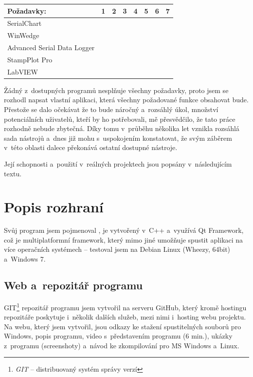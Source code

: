 \documentclass[12pt, a4paper, oneside]{article}
\newcommand{\It}{\textit}  %
\newcommand{\Has}{\textcolor{green}{\CheckmarkBold}}
\newcommand{\NoHas}{\textcolor{red}{\XSolidBrush}}
\begin{document}
\begin{tabular}{ | l | l | l | l | l | l | l | l |}
    \hline
    Požadavky:                  & 1      & 2      & 3      & 4      & 5      & 6      & 7      \\ \hline
    SerialChart                 & \Has   & \NoHas & \Has   & \NoHas & \Has   & \Has   & \Has   \\ \hline 
    WinWedge                    & \NoHas & \Has   & \Has   & \NoHas & \NoHas & \NoHas & \NoHas \\ \hline 
    Advanced Serial Data Logger & \NoHas & \Has   & \Has   & \NoHas & \NoHas & \NoHas & \NoHas \\ \hline 
    StampPlot Pro               & \Has   & \Has   & \NoHas & \NoHas & \Has   & \NoHas & \Has   \\ \hline 
    LabVIEW                     & \Has   & \Has   & \NoHas & \Has   & \NoHas & \NoHas & \Has   \\ \hline
\end{tabular}

\vspace{5mm}

Žádný z~dostupných programů nesplňuje všechny požadavky, proto jsem se rozhodl napsat vlastní aplikaci, která všechny požadované funkce obsahovat bude.  Přestože se dalo očekávat že to bude náročný a~rozsáhlý úkol, množství potenciálních uživatelů, kteří by ho potřebovali, mě přesvědčilo, že tato práce rozhodně nebude zbytečná. Díky tomu v~průběhu několika let vznikla rozsáhlá sada nástrojů a~dnes již mohu s~uspokojením konstatovat, že svým záběrem v~této oblasti dalece překonává ostatní dostupné nástroje.

Její schopnosti a~použití v~reálných projektech jsou popsány v~následujícím textu.

\newpage
\section{Popis rozhraní}
Svůj program jsem pojmenoval , je vytvořený v~C++ a~využívá Qt Framework\cite{qtfrm}, což je multiplatformní framework, který mimo jiné umožňuje spustit aplikaci na více operačních systémech -- testoval jsem na Debian Linux\cite{debian} (Wheezy, 64bit) a~Windows 7.

\subsection{Web a~repozitář programu}
GIT\footnote{\It{GIT} -- distribuovaný systém správy verzí} repozitář programu jsem vytvořil na serveru GitHub\cite{github}, který kromě hostingu repozitáře poskytuje i~několik dalších služeb, mezi nimi i~hosting webu projektu. Na webu, který jsem vytvořil, jsou odkazy ke stažení spustitelných souborů pro Windows, popis programu, video s~představením programu (6 min.), ukázky z~programu (screenshoty) a~návod ke zkompilování pro MS Windows a~Linux.
\end{document}
